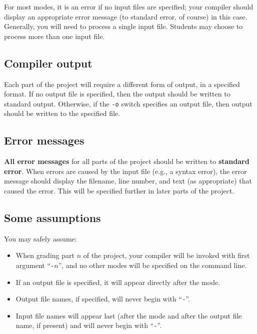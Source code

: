 \documentclass{article}
\begin{document}
For most modes, it is an error if no input files are specified;
your compiler should display an appropriate error message
(to standard error, of course) in this case.
Generally, you will need to process a single input file.
Students may choose to process more than one input file.

\subsection{Compiler output}

Each part of the project will require a different form of output,
in a specified format.
If no output file is specified, then the output should be written
to standard output.
Otherwise, if the {\tt -o} switch specifies an output file,
then output should be written to the specified file.

\subsection{Error messages}

{\bf All error messages} for all parts of the project
should be written to {\bf standard error}.
When errors are caused by the input file (e.g., a syntax error),
the error message should display the filename, line number, and text
(as appropriate) that caused the error.
This will be specified further in later parts of the project.

\subsection{Some assumptions}


You may safely assume:
\begin{itemize}
  \item When grading part $n$ of the project,
        your compiler will be invoked with
        first argument ``{\tt -}$n$'',
        and no other modes will be specified on the command line.

  \item If an output file is specified,
        it will appear directly after the mode.

  \item Output file names, if specified,
        will never begin with ``{\tt -}''.

  \item Input file names will appear last
        (after the mode and after the output file name, if present)
        and will never begin with ``{\tt -}''.

\end{itemize}
\end{document}

